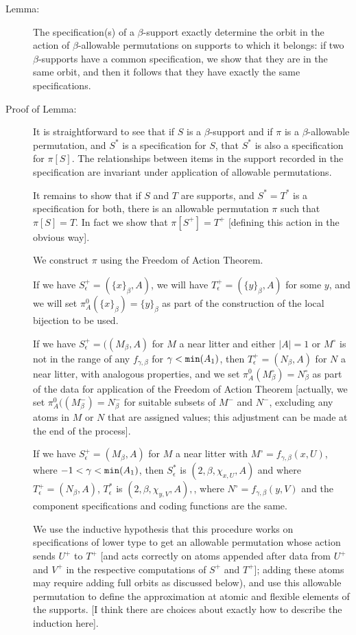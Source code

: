 \documentclass[112pt]{article}
\begin{document}
\begin{description}
\item[Lemma:]  The specification(s) of a $\beta$-support exactly determine the orbit in the action of $\beta$-allowable permutations on supports to which it belongs:  if two $\beta$-supports have a common specification, we show that they are in the same orbit, and then it follows that they have exactly the same specifications.

\item[Proof of Lemma:]

It is straightforward to see that if $S$ is a $\beta$-support and if $\pi$ is a $\beta$-allowable permutation, and $S^*$ is a specification for $S$, that $S^*$ is also a specification for $\pi[S]$.  The relationships between items in the support recorded in the specification are invariant under application of allowable permutations.

It remains to show that if $S$ and $T$ are supports, and $S^*=T^*$ is a specification for both, there is an allowable permutation $\pi$ such that $\pi[S]=T$.  In fact we show that $\pi[S^+]=T^+$  [defining this action in the obvious way].

We construct $\pi$ using the Freedom of Action Theorem.

If we have $S^+_\epsilon = (\{x\}_\beta,A)$, we will have $T^+_\epsilon = (\{y\}_\beta,A)$ for some $y$, and we will set $\pi^0_A(\{x\}_\beta) = \{y\}_\beta$ as part of the construction of the local bijection to be used.

If we have $S^+_\epsilon = ((M_\beta,A)$ for $M$ a near litter and either $|A|=1$ or $M^\circ$ is not in the range of any $f_{\gamma,\beta}$ for $\gamma<{\tt min}(A_1)$, then $T^+_\epsilon = (N_\beta,A)$ for $N$ a near litter, with analogous properties, and we set $\pi^0_A(M^\circ_\beta) = N^\circ_\beta$  as part of the data for application of the Freedom of Action Theorem [actually, we set $\pi^0_A((M^-_\beta) = N^-_\beta$  for suitable subsets of $M^-$ and $N^-$, excluding any atoms in $M$ or $N$ that are assigned values;  this adjustment can be made at the end of the process].


If we have $S^+_\epsilon= (M_\beta,A)$ for $M$ a near litter with $M^\circ = f_{\gamma,\beta}(x,U)$, where $-1<\gamma<{\tt min}(A_1)$,
then $S^*_\epsilon$ is $(2,\beta,\chi_{x,U},A)$ and where $T^+_\epsilon=(N_\beta,A)$, $T^*_\epsilon$ is $(2,\beta,\chi_{y,V},A),$, where $N^\circ = f_{\gamma,\beta}(y,V)$ and the component specifications and coding functions are the same.

We use the inductive hypothesis that this procedure works on specifications of lower type to get an allowable permutation whose action sends $U^+$ to $T^+$ [and acts correctly on atoms appended after data from $U^+$ and $V^+$ in the respective computations of $S^+$ and $T^+$];  adding these atoms may require adding full orbits as discussed below), and use this allowable permutation to define
the approximation at atomic and flexible elements of the supports.  [I think there are choices about exactly how to describe the induction here].


\end{description}
\end{document}
